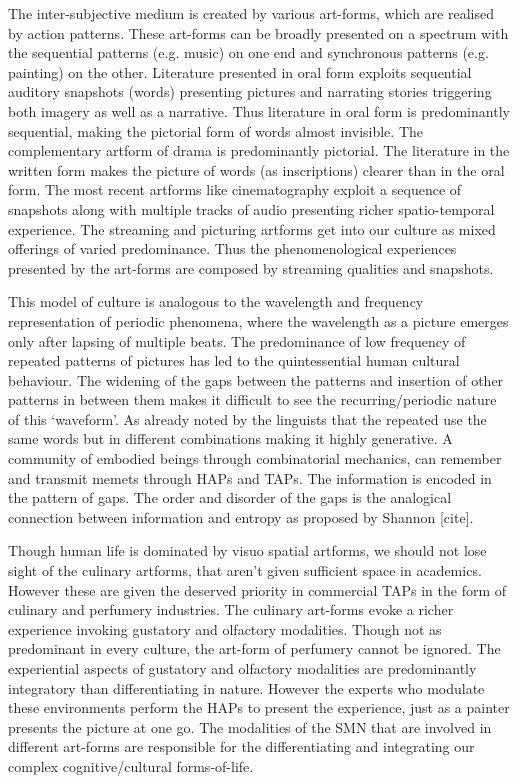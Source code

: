 The inter-subjective medium is created by various art-forms, which are realised by action patterns. These art-forms can be broadly presented on a spectrum with the sequential patterns (e.g. music) on one end and synchronous patterns (e.g. painting) on the other. 
Literature presented in oral form exploits sequential auditory snapshots (words) presenting pictures and narrating stories triggering both imagery as well as a narrative. Thus literature in oral form is predominantly sequential, making the pictorial form of words almost invisible. The complementary artform of drama is predominantly pictorial. The literature in the written form makes the picture of words (as inscriptions) clearer than in the oral form.  The most recent artforms like cinematography exploit a sequence of snapshots along with multiple tracks of audio presenting richer spatio-temporal experience.  The streaming and picturing artforms get into our culture as mixed offerings of varied predominance. Thus the phenomenological experiences presented by the art-forms are composed by streaming qualities and snapshots.

This model of culture is analogous to the wavelength and frequency representation of periodic phenomena, where the wavelength as a picture emerges only after lapsing of multiple beats. The predominance of low frequency of repeated patterns of pictures has led to the quintessential human cultural behaviour. The widening of the gaps between the patterns and insertion of other patterns in between them makes it difficult to see the recurring/periodic nature of this `waveform'. As already noted by the linguists that the repeated use the same words but in different combinations making it highly generative.
A community of embodied beings through combinatorial mechanics, can remember and transmit memets through HAPs and TAPs. The information is encoded in the pattern of gaps. The order and disorder of the gaps is the analogical connection between information and entropy as proposed by Shannon [cite].

Though human life is dominated by visuo spatial artforms, we should not lose sight of the culinary artforms, that aren't given sufficient space in academics. However these are given the deserved priority in commercial TAPs in the form of culinary and perfumery industries. The culinary art-forms evoke a richer experience invoking gustatory and olfactory modalities. Though not as predominant in every culture, the art-form of perfumery cannot be ignored. The experiential aspects of gustatory and olfactory modalities are predominantly integratory than differentiating in nature. However the experts who modulate these environments perform the HAPs to present the experience, just as a painter presents the picture at one go. The modalities of the SMN that are involved in different art-forms are responsible for the differentiating and integrating our complex cognitive/cultural forms-of-life.


